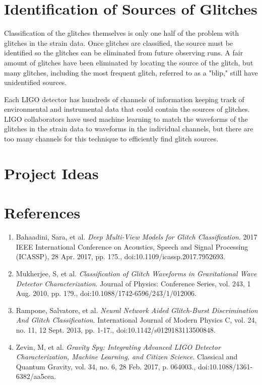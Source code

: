 \documentclass[a4paper]{article}
\begin{document}
\section{Identification of Sources of Glitches}

Classification of the glitches themselves is only one half of the problem with glitches in the strain data. Once glitches are classified, the source must be identified so the glitches can be eliminated from future observing runs. A fair amount of glitches have been eliminated by locating the source of the glitch, but many glitches, including the most frequent glitch, referred to as a "blip," still have unidentified sources.

Each LIGO detector has hundreds of channels of information keeping track of environmental and instrumental data that could contain the sources of glitches. LIGO collaborators have used machine learning to match the waveforms of the glitches in the strain data to waveforms in the individual channels, but there are too many channels for this technique to efficiently find glitch sources.






\section{Project Ideas}

\section{References}
\begin{enumerate}
	\item Bahaadini, Sara, et al. \textit{Deep Multi-View Models for Glitch Classification}. 2017 IEEE International Conference on Acoustics, Speech and Signal Processing (ICASSP), 28 Apr. 2017, pp. 1?5., doi:10.1109/icassp.2017.7952693.
	\item Mukherjee, S, et al. \textit{Classification of Glitch Waveforms in Gravitational Wave Detector Characterization}. Journal of Physics: Conference Series, vol. 243, 1 Aug. 2010, pp. 1?9., doi:10.1088/1742-6596/243/1/012006.
	\item Rampone, Salvatore, et al. \textit{Neural Network Aided Glitch-Burst Discrimination And Glitch Classification}. International Journal of Modern Physics C, vol. 24, no. 11, 12 Sept. 2013, pp. 1-17., doi:10.1142/s0129183113500848.
	\item Zevin, M, et al. \textit{Gravity Spy: Integrating Advanced LIGO Detector Characterization, Machine Learning, and Citizen Science}. Classical and Quantum Gravity, vol. 34, no. 6, 28 Feb. 2017, p. 064003., doi:10.1088/1361-6382/aa5cea.
\end{enumerate}
\end{document}
